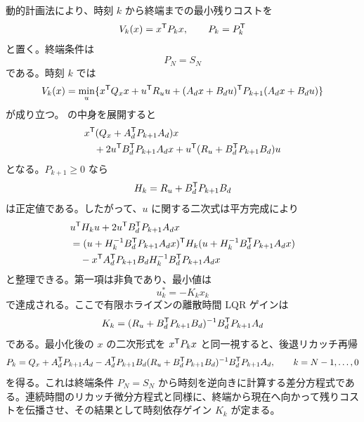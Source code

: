 動的計画法により、時刻 $k$ から終端までの最小残りコストを
\begin{equation}
  V_k(x)=x^{\mathsf{T}} P_k x,
  \qquad P_k=P_k^{\mathsf{T}}
  \label{eq:dlqr-value}
\end{equation}
と置く。終端条件は
\begin{equation}
  P_N=S_N
  \label{eq:dlqr-terminal}
\end{equation}
である。時刻 $k$ では
\begin{align}
  V_k(x)
  =
  \min_u
  \{x^{\mathsf{T}} Q_x x+u^{\mathsf{T}} R_u u
  +(A_d x+B_d u)^{\mathsf{T}} P_{k+1}(A_d x+B_d u)\}
  \label{eq:dlqr-bellman}
\end{align}
が成り立つ。 の中身を展開すると
\begin{align}
  &x^{\mathsf{T}}(Q_x+A_d^{\mathsf{T}} P_{k+1}A_d)x\\
  &\quad
  +2u^{\mathsf{T}} B_d^{\mathsf{T}} P_{k+1}A_d x
  +u^{\mathsf{T}}(R_u+B_d^{\mathsf{T}} P_{k+1}B_d)u
  \label{eq:dlqr-expanded}
\end{align}
となる。$P_{k+1}\ge0$ なら
\begin{equation}
  H_k=R_u+B_d^{\mathsf{T}} P_{k+1}B_d
  \label{eq:dlqr-hessian}
\end{equation}
は正定値である。したがって、$u$ に関する二次式は平方完成により
\begin{align}
  &u^{\mathsf{T}} H_k u+2u^{\mathsf{T}} B_d^{\mathsf{T}} P_{k+1}A_d x\\
  &=
  (u+H_k^{-1}B_d^{\mathsf{T}} P_{k+1}A_d x)^{\mathsf{T}}
  H_k
  (u+H_k^{-1}B_d^{\mathsf{T}} P_{k+1}A_d x)\\
  &\quad
  -x^{\mathsf{T}} A_d^{\mathsf{T}} P_{k+1}B_d
  H_k^{-1}
  B_d^{\mathsf{T}} P_{k+1}A_d x
  \label{eq:dlqr-completion}
\end{align}
と整理できる。第一項は非負であり、最小値は
\begin{equation}
  u_k^*=-K_kx_k
  \label{eq:dlqr-optimal-input}
\end{equation}
で達成される。ここで有限ホライズンの離散時間 LQR ゲインは
\begin{equation}
  K_k
  =
  (R_u+B_d^{\mathsf{T}} P_{k+1}B_d)^{-1}
  B_d^{\mathsf{T}} P_{k+1}A_d
  \label{eq:dlqr-finite-gain}
\end{equation}
である。最小化後の $x$ の二次形式を $x^{\mathsf{T}} P_kx$ と同一視すると、後退リカッチ再帰
\begin{equation}
  P_k
  =
  Q_x+A_d^{\mathsf{T}} P_{k+1}A_d
  -A_d^{\mathsf{T}} P_{k+1}B_d
  (R_u+B_d^{\mathsf{T}} P_{k+1}B_d)^{-1}
  B_d^{\mathsf{T}} P_{k+1}A_d,
  \qquad k=N-1,\ldots,0
  \label{eq:dlqr-backward-riccati}
\end{equation}
を得る。これは終端条件 $P_N=S_N$ から時刻を逆向きに計算する差分方程式である。連続時間のリカッチ微分方程式と同様に、終端から現在へ向かって残りコストを伝播させ、その結果として時刻依存ゲイン $K_k$ が定まる。

